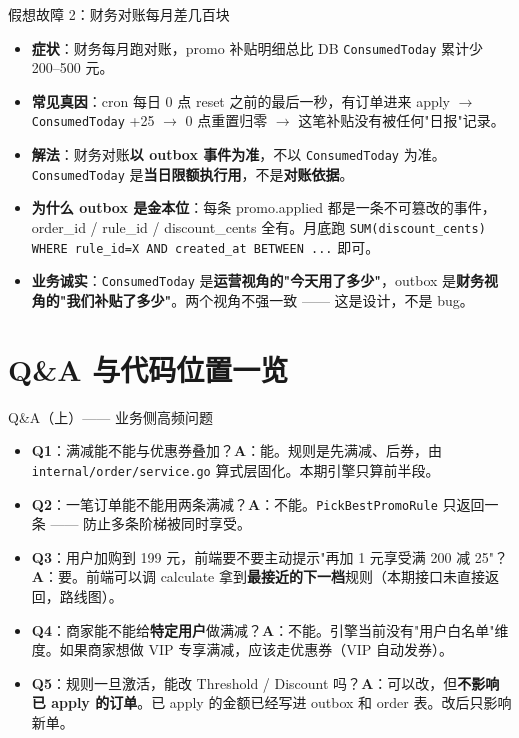 \documentclass[aspectratio=169,11pt]{beamer}
\begin{document}
\begin{frame}[shrink]{假想故障 2：财务对账每月差几百块}
\begin{itemize}
  \item \textbf{症状}：财务每月跑对账，promo 补贴明细总比 DB \texttt{ConsumedToday} 累计少 200--500 元。
  \item \textbf{常见真因}：cron 每日 0 点 reset 之前的最后一秒，有订单进来 apply $\to$ \texttt{ConsumedToday} +25 $\to$ 0 点重置归零 $\to$ 这笔补贴没有被任何"日报"记录。
  \item \textbf{解法}：财务对账\textbf{以 outbox 事件为准}，不以 \texttt{ConsumedToday} 为准。\texttt{ConsumedToday} 是\textbf{当日限额执行用}，不是\textbf{对账依据}。
  \item \textbf{为什么 outbox 是金本位}：每条 promo.applied 都是一条不可篡改的事件，order\_id / rule\_id / discount\_cents 全有。月底跑 \texttt{SUM(discount\_cents) WHERE rule\_id=X AND created\_at BETWEEN ...} 即可。
  \item \textbf{业务诚实}：\texttt{ConsumedToday} 是\textbf{运营视角的"今天用了多少"}，outbox 是\textbf{财务视角的"我们补贴了多少"}。两个视角不强一致 —— 这是设计，不是 bug。
\end{itemize}
\end{frame}

\section{Q\&A 与代码位置一览}

\begin{frame}[shrink]{Q\&A（上）—— 业务侧高频问题}
\begin{itemize}
  \item \textbf{Q1}：满减能不能与优惠券叠加？\textbf{A}：能。规则是先满减、后券，由 \texttt{internal/order/service.go} 算式层固化。本期引擎只算前半段。
  \item \textbf{Q2}：一笔订单能不能用两条满减？\textbf{A}：不能。\texttt{PickBestPromoRule} 只返回一条 —— 防止多条阶梯被同时享受。
  \item \textbf{Q3}：用户加购到 199 元，前端要不要主动提示"再加 1 元享受满 200 减 25"？\textbf{A}：要。前端可以调 calculate 拿到\textbf{最接近的下一档}规则（本期接口未直接返回，路线图）。
  \item \textbf{Q4}：商家能不能给\textbf{特定用户}做满减？\textbf{A}：不能。引擎当前没有"用户白名单"维度。如果商家想做 VIP 专享满减，应该走优惠券（VIP 自动发券）。
  \item \textbf{Q5}：规则一旦激活，能改 Threshold / Discount 吗？\textbf{A}：可以改，但\textbf{不影响已 apply 的订单}。已 apply 的金额已经写进 outbox 和 order 表。改后只影响新单。
\end{itemize}
\end{frame}
\end{document}
